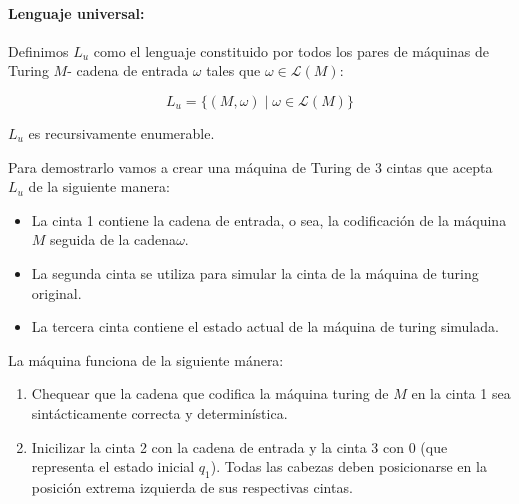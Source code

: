 \paragraph{Lenguaje universal:} Definimos \(L_u\) como el lenguaje constituido por todos los pares de máquinas de Turing \(M\)- cadena de entrada \(\omega\) tales que \(\omega\in\mathcal{L}(M)\):

\[ L_u = \{ (M, \omega) \mid \omega\in\mathcal{L}(M)\}\]

\begin{teorema}
  \(L_u\) es recursivamente enumerable.
\end{teorema}

\begin{demo}[0.8\textwidth]
  Para demostrarlo vamos a crear una máquina de Turing de 3 cintas que acepta \(L_u\) de la siguiente manera:
  \begin{itemize}
    \item La cinta 1 contiene la cadena de entrada, o sea, la codificación de la máquina \(M\) seguida de la cadena\(\omega\).
    \item La segunda cinta se utiliza para simular la cinta de la máquina de turing original.
    \item La tercera cinta contiene el estado actual de la máquina de turing simulada.
  \end{itemize}
  La máquina funciona de la siguiente mánera:
  \begin{enumerate}
    \item Chequear que la cadena que codifica la máquina turing de \(M\) en la cinta 1 sea sintácticamente correcta y determinística.
    \item Inicilizar la cinta 2 con la cadena de entrada y la cinta 3 con 0 (que representa el estado inicial \(q_1\)). Todas las cabezas deben posicionarse en la posición extrema izquierda de sus respectivas cintas.
  \end{enumerate}
\end{demo}
